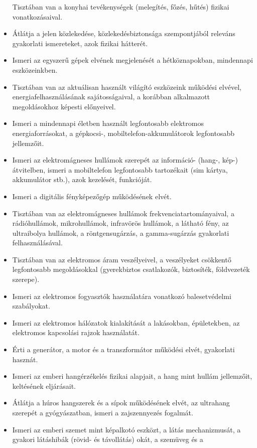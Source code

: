 \begin{itemize}
  Tisztában van a konyhai tevékenységek (melegítés, főzés, hűtés)
  fizikai vonatkozásaival.
\item
  Átlátja a jelen közlekedése, közlekedésbiztonsága szempontjából
  releváns gyakorlati ismereteket, azok fizikai hátterét.
\item
  Ismeri az egyszerű gépek elvének megjelenését a hétköznapokban,
  mindennapi eszközeinkben.
\item
  Tisztában van az aktuálisan használt világító eszközeink működési
  elvével, energiafelhasználásának sajátosságaival, a korábban
  alkalmazott megoldásokhoz képesti előnyeivel.
\item
  Ismeri a mindennapi életben használt legfontosabb elektromos
  energiaforrásokat, a gépkocsi-, mobiltelefon-akkumulátorok
  legfontosabb jellemzőit.
\item
  Ismeri az elektromágneses hullámok szerepét az információ- (hang-,
  kép-) átvitelben, ismeri a mobiltelefon legfontosabb tartozékait (sim
  kártya, akkumulátor stb.), azok kezelését, funkcióját.
\item
  Ismeri a digitális fényképezőgép működésének elvét.
\item
  Tisztában van az elektromágneses hullámok frekvenciatartományaival, a
  rádióhullámok, mikrohullámok, infravörös hullámok, a látható fény, az
  ultraibolya hullámok, a röntgensugárzás, a gamma-sugárzás gyakorlati
  felhasználásával.
\item
  Tisztában van az elektromos áram veszélyeivel, a veszélyeket csökkentő
  legfontosabb megoldásokkal (gyerekbiztos csatlakozók, biztosíték,
  földvezeték szerepe).
\item
  Ismeri az elektromos fogyasztók használatára vonatkozó balesetvédelmi
  szabályokat.
\item
  Ismeri az elektromos hálózatok kialakítását a lakásokban, épületekben,
  az elektromos kapcsolási rajzok használatát.
\item
  Érti a generátor, a motor és a transzformátor működési elvét,
  gyakorlati hasznát.
\item
  Ismeri az emberi hangérzékelés fizikai alapjait, a hang mint hullám
  jellemzőit, keltésének eljárásait.
\item
  Átlátja a húros hangszerek és a sípok működésének elvét, az ultrahang
  szerepét a gyógyászatban, ismeri a zajszennyezés fogalmát.
\item
  Ismeri az emberi szemet mint képalkotó eszközt, a látás mechanizmusát,
  a gyakori látáshibák (rövid- és távollátás) okát, a szemüveg és a

\end{itemize}
